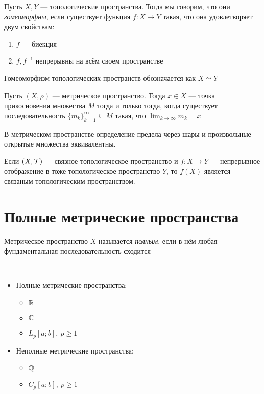 \begin{definition}
	Пусть $X, Y$ --- топологические пространства. Тогда мы говорим, что они \textit{гомеоморфны}, если существует функция $f \colon X \to Y$ такая, что она удовлетворяет двум свойствам:
	\begin{enumerate}
		\item $f$ --- биекция
		
		\item $f, f^{-1}$ непрерывны на всём своем пространстве
	\end{enumerate}
	Гомеоморфизм топологических пространств обозначается как $X \simeq Y$
\end{definition}

\begin{exercise}
	Пусть $(X, \rho)$ --- метрическое пространство. Тогда $x \in X$ --- точка прикосновения множества $M$ тогда и только тогда, когда существует последовательность $\{m_k\}_{k = 1}^\infty \subseteq M$ такая, что $\lim_{k \to \infty} m_k = x$
\end{exercise}

\begin{exercise}
	В метрическом пространстве определение предела через шары и произвольные открытые множества эквивалентны.
\end{exercise}

\begin{exercise}
	Если $(X, \mathcal{T})$ --- связное топологическое пространство и $f \colon X \to Y$ --- непрерывное отображение в тоже топологическое пространство $Y$, то $f(X)$ является связаным топологическим пространством.
\end{exercise}
 
\section{Полные метрические пространства}

\begin{definition}
	Метрическое пространство $X$ называется \textit{полным}, если в нём любая фундаментальная последовательность сходится
\end{definition}

\begin{example}~
	\begin{itemize}
		\item Полные метрические пространства:
		\begin{itemize}
			\item $\mathbb{R}$
			
			\item $\mathbb{C}$
			
			\item $L_p[a; b],\ p \ge 1$
		\end{itemize}
		
		\item Неполные метрические пространства:
		\begin{itemize}
			\item $\mathbb{Q}$
			
			\item $C_p[a; b],\ p \ge 1$
		\end{itemize}
	\end{itemize}
\end{example}

